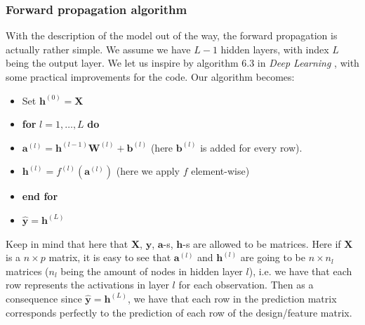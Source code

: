 \documentclass{article}
\begin{document}
\subsubsection{Forward propagation algorithm}
\label{forwardprop}
With the description of the model out of the way, the forward propagation is actually
rather simple. We assume we have $L-1$ hidden layers, with index $L$ being the
output layer. We let us inspire by algorithm 6.3 in \textit{Deep Learning}
\cite[p.~212]{goodfellow2016deep}, with some practical improvements for the
code. Our algorithm becomes:
\begin{itemize}
      \item Set $\bm{h}^{(0)} = \bm{X}$
      \item \textbf{for} $l = 1, \dots, L$ \textbf{do}
      \item $\bm{a}^{(l)} = \bm{h}^{(l-1)} \bm{W}^{(l)} + \bm{b}^{(l)}$ (here $\bm{b}^{(l)}$ is added for every row).
      \item $\bm{h}^{(l)} = f^{(l)}(\bm{a}^{(l)})$ (here we apply $f$ element-wise)
      \item \textbf{end for}
      \item $\hat{\bm{y}} = \bm{h}^{(L)}$
\end{itemize}
Keep in mind that here that $\bm{X}$, $\bm{y}$, $\bm{a}$-s, $\bm{h}$-s are
allowed to be matrices. Here if $\bm{X}$ is a $n \times p$ matrix, it is easy to
see that $\bm{a}^{(l)}$ and $\bm{h}^{(l)}$ are going to be $n \times n_l$
matrices ($n_l$ being the amount of nodes in hidden layer $l$), i.e. we have
that each row represents the activations in layer $l$ for each observation. Then
as a consequence since $\hat{\bm{y}} = \bm{h}^{(L)}$, we have that each row in
the prediction matrix corresponds perfectly to the prediction of each row of the
design/feature matrix.
\end{document}
